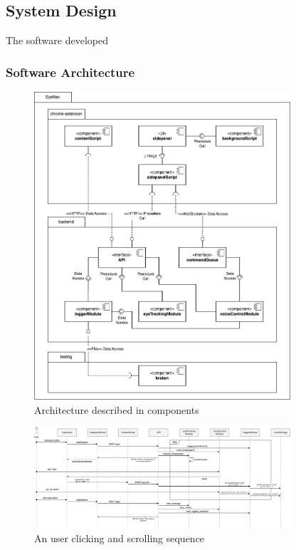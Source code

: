 \subsection{System Design}

The software developed 

\subsubsection{Software Architecture}

\begin{figure}[ht]
    \centering
    \includegraphics[width=0.85\textwidth]{images/components-diagram.jpg}
    \caption{Architecture described in components}
    \label{fig:components-diagram}
\end{figure}

\begin{figure}[ht]
    \centering
    \includegraphics[width=0.85\textwidth]{images/sequence-diagram.jpg}
    \caption{An user clicking and scrolling sequence}
    \label{fig:sequence-diagram}
\end{figure}


